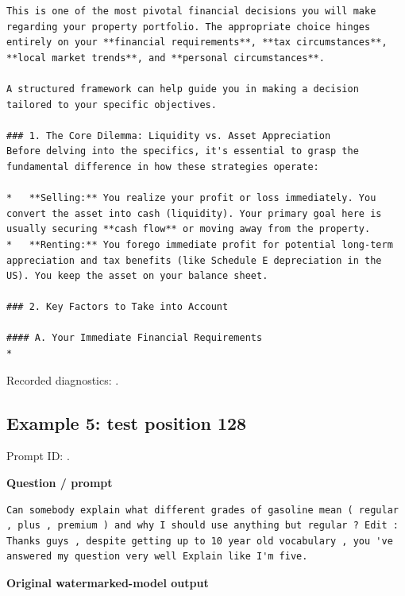 \begin{Verbatim}
This is one of the most pivotal financial decisions you will make regarding your property portfolio. The appropriate choice hinges entirely on your **financial requirements**, **tax circumstances**, **local market trends**, and **personal circumstances**.

A structured framework can help guide you in making a decision tailored to your specific objectives.

### 1. The Core Dilemma: Liquidity vs. Asset Appreciation
Before delving into the specifics, it's essential to grasp the fundamental difference in how these strategies operate:

*   **Selling:** You realize your profit or loss immediately. You convert the asset into cash (liquidity). Your primary goal here is usually securing **cash flow** or moving away from the property.
*   **Renting:** You forego immediate profit for potential long-term appreciation and tax benefits (like Schedule E depreciation in the US). You keep the asset on your balance sheet.

### 2. Key Factors to Take into Account

#### A. Your Immediate Financial Requirements
*
\end{Verbatim}

Recorded diagnostics:
\texttt{}.

\subsection{Example 5: test position
128}\label{record-docs-watermarking-qualitative-text-latent-vanilla-md-example-5-test-position-128}

Prompt ID:
\texttt{}.

\textbf{Question / prompt}

\begin{Verbatim}
Can somebody explain what different grades of gasoline mean ( regular , plus , premium ) and why I should use anything but regular ? Edit : Thanks guys , despite getting up to 10 year old vocabulary , you 've answered my question very well Explain like I'm five.
\end{Verbatim}

\textbf{Original watermarked-model output}

